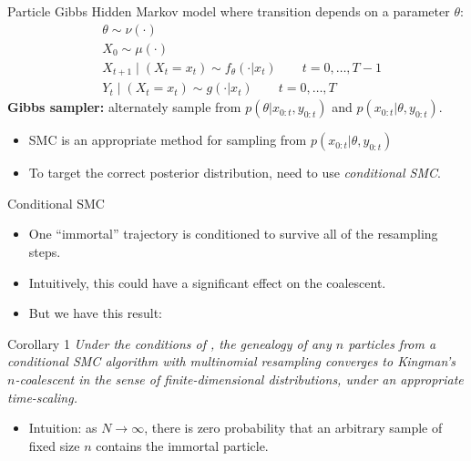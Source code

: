 \documentclass[aspectratio=169]{beamer}
\theoremstyle{definition}
\begin{document}
\begin{frame}{Particle Gibbs \citep{andrieu2010}}
Hidden Markov model where transition depends on a parameter $\theta$:
\begin{align*}
& \theta \sim \nu(\cdot) \\
& X_0 \sim \mu(\cdot) \\
& X_{t+1} \mid (X_t = x_t) \sim f_{\theta}(\cdot | x_t)  \qquad t=0,\dots,T-1 \\
& Y_t \mid (X_t = x_t) \sim g(\cdot | x_t) \qquad t=0,\dots,T
\end{align*}
\pause
\textbf{Gibbs sampler:} alternately sample from $p(\theta | x_{0:t}, y_{0:t})$ and $p(x_{0:t} | \theta, y_{0:t})$.\\[7pt]
\begin{itemize}
\item SMC is an appropriate method for sampling from $p(x_{0:t} | \theta, y_{0:t})$
\item To target the correct posterior distribution, need to use \emph{conditional SMC}.
\end{itemize}
\end{frame}

\begin{frame}{Conditional SMC}
\begin{itemize}
\item One ``immortal'' trajectory is conditioned to survive all of the resampling steps.
\item Intuitively, this could have a significant effect on the coalescent. 
\pause
\item But we have this result:
\end{itemize}
\begin{block}{Corollary 1}
\textit{Under the conditions of \cite[Lemma 3]{koskela2018}
, the genealogy of any $n$ particles from a conditional SMC algorithm with multinomial resampling converges to Kingman's $n$-coalescent in the sense of finite-dimensional distributions, under an appropriate time-scaling.}
\end{block}
\pause
\begin{itemize}
\item Intuition: as $N\to\infty$, there is zero probability that an arbitrary sample of fixed size $n$ contains the immortal particle.
\end{itemize}
\end{frame}
\end{document}
